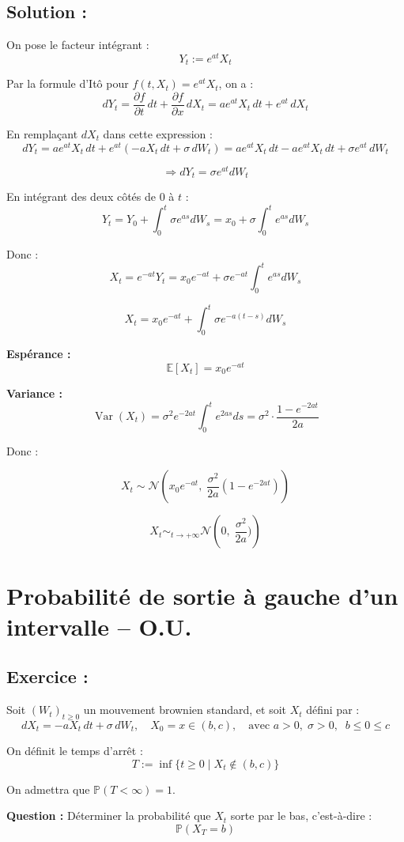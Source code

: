 \subsection*{Solution :}

On pose le facteur intégrant :
\[
Y_t := e^{a t} X_t
\]

Par la formule d’Itô pour \( f(t, X_t) = e^{a t} X_t \), on a :
\[
dY_t = \frac{\partial f}{\partial t}\, dt + \frac{\partial f}{\partial x}\, dX_t = a e^{a t} X_t\, dt + e^{a t} \, dX_t
\]

En remplaçant \( dX_t \) dans cette expression :
\[
dY_t = a e^{a t} X_t\, dt + e^{a t} (-a X_t\, dt + \sigma\, dW_t) = a e^{a t} X_t\, dt - a e^{a t} X_t\, dt + \sigma e^{a t} \, dW_t
\]

\[
\Rightarrow dY_t = \sigma e^{a t} dW_t
\]

En intégrant des deux côtés de \( 0 \) à \( t \) :
\[
Y_t = Y_0 + \int_0^t \sigma e^{a s} dW_s = x_0 + \sigma \int_0^t e^{a s} dW_s
\]

Donc :
\[
X_t = e^{-a t} Y_t = x_0 e^{-a t} + \sigma e^{-a t} \int_0^t e^{a s} dW_s
\]

\[
\boxed{
X_t = x_0 e^{-a t} + \int_0^t \sigma e^{-a(t-s)} dW_s
}
\]




\vspace{0.2cm}
\textbf{Espérance :}
\[
\mathbb{E}[X_t] = x_0 e^{-a t}
\]

\textbf{Variance :}
\[
\operatorname{Var}(X_t) = \sigma^2 e^{-2a t} \int_0^t e^{2a s} ds = \sigma^2 \cdot \frac{1 - e^{-2a t}}{2a}
\]

\vspace{0.3cm}
Donc : 

\[
\boxed{
X_t \sim \mathcal{N} \left( x_0 e^{-a t}, \; \frac{\sigma^2}{2a} \left( 1 - e^{-2a t} \right) \right)
}
\]

\[
\boxed{
X_t \sim_{t \rightarrow +\infty} \mathcal{N} \left( 0, \; \frac{\sigma^2}{2a}) \right)
}
\]


\section{Probabilité de sortie à gauche d’un intervalle – O.U.}

\subsection*{Exercice :}

\begin{exerciseBox}
Soit \( (W_t)_{t \geq 0} \) un mouvement brownien standard, et soit \( X_t \) défini par :
\[
dX_t = -a X_t\, dt + \sigma\, dW_t, \quad X_0 = x \in (b, c), \quad \text{avec } a > 0, \; \sigma > 0 ,\; \; b \leq 0 \leq c 
\]

On définit le temps d’arrêt :
\[
T := \inf\{t \geq 0 \;|\; X_t \notin (b, c)\}
\]

 On admettra que $\mathbb{P}(T < \infty) = 1$.

\textbf{Question :} Déterminer la probabilité que \( X_t \) sorte par le bas, c’est-à-dire :
\[
\mathbb{P}(X_T = b)
\]
\end{exerciseBox}

